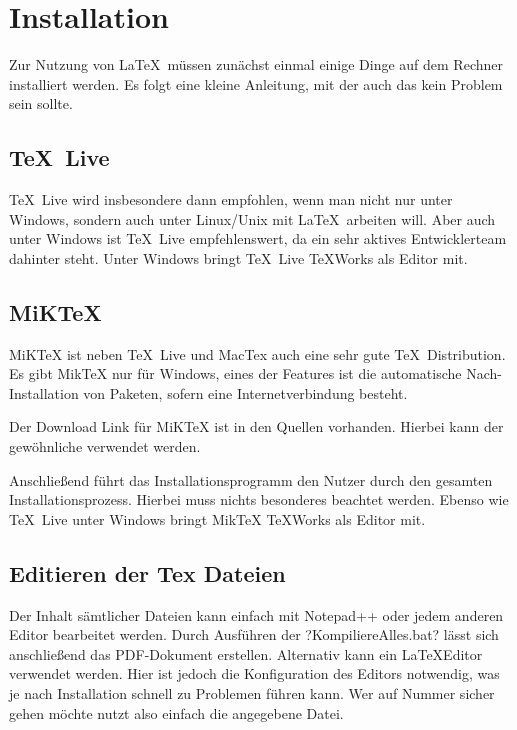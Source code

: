 
\chapter{Installation}\label{ch:installation}

Zur Nutzung von \LaTeX\ müssen zunächst einmal einige Dinge auf dem Rechner installiert werden. 
Es folgt eine kleine Anleitung, mit der auch das kein Problem sein sollte.

\section{\TeX\ Live}

\TeX\ Live wird insbesondere dann empfohlen, wenn man nicht nur unter Windows, sondern auch unter Linux/Unix mit \LaTeX\ arbeiten will. Aber auch unter Windows ist \TeX\ Live empfehlenswert, da ein sehr aktives Entwicklerteam dahinter steht. Unter Windows bringt \TeX\ Live \TeX Works als Editor mit.

\section{MiKTeX}

MiKTeX ist neben \TeX\ Live und MacTex auch eine sehr gute \TeX\ Distribution. Es gibt MikTeX nur für Windows, eines der Features ist die automatische Nach-Installation von Paketen, sofern eine Internetverbindung besteht.

Der Download Link für MiKTeX ist in den Quellen vorhanden. Hierbei kann der gewöhnliche  verwendet werden. 

Anschließend führt das Installationsprogramm den Nutzer durch den gesamten Installationsprozess. Hierbei muss nichts besonderes beachtet werden. Ebenso wie \TeX\ Live unter Windows bringt MikTeX \TeX Works als Editor mit.

\section{Editieren der Tex Dateien}
Der Inhalt sämtlicher Dateien kann einfach mit Notepad++ oder jedem anderen Editor bearbeitet werden. Durch Ausführen der \befehl?KompiliereAlles.bat? lässt sich anschließend das PDF-Dokument erstellen. Alternativ kann ein \LaTeX\-Editor verwendet werden. Hier ist jedoch die Konfiguration des Editors notwendig, was je nach Installation schnell zu Problemen führen kann. Wer auf Nummer sicher gehen möchte nutzt also einfach die angegebene Datei.

